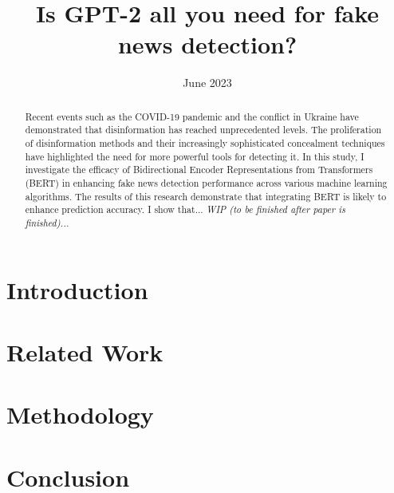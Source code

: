 \documentclass[magisterska,en]{mgr}
\title{Is GPT-2 all you need for fake news detection?}
\date{June 2023}
\begin{document}
\maketitle

\begin{abstract}
    Recent events such as the COVID-19 pandemic and the conflict in Ukraine have demonstrated that disinformation has reached unprecedented levels. The proliferation of disinformation methods and their increasingly sophisticated concealment techniques have highlighted the need for more powerful tools for detecting it. In this study, I investigate the efficacy of Bidirectional Encoder Representations from Transformers (BERT) in enhancing fake news detection performance across various machine learning algorithms. The results of this research demonstrate that integrating BERT is likely to enhance prediction accuracy. I show that... \textit{WIP (to be finished after paper is finished)...}
\end{abstract}

\tableofcontents

\chapter*{Introduction}


\chapter{Related Work}\label{r:related_work}


\chapter{Methodology}\label{r:methodology}


\chapter{Conclusion}\label{r:conclusion}


\appendix

\printbibliography[heading=bibintoc]
\end{document}
